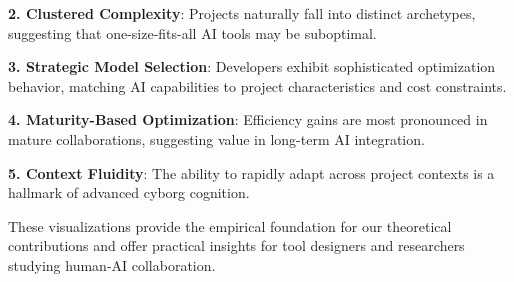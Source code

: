 \textbf{2. Clustered Complexity}: Projects naturally fall into distinct archetypes, suggesting that one-size-fits-all AI tools may be suboptimal.

\textbf{3. Strategic Model Selection}: Developers exhibit sophisticated optimization behavior, matching AI capabilities to project characteristics and cost constraints.

\textbf{4. Maturity-Based Optimization}: Efficiency gains are most pronounced in mature collaborations, suggesting value in long-term AI integration.

\textbf{5. Context Fluidity}: The ability to rapidly adapt across project contexts is a hallmark of advanced cyborg cognition.

These visualizations provide the empirical foundation for our theoretical contributions and offer practical insights for tool designers and researchers studying human-AI collaboration.
